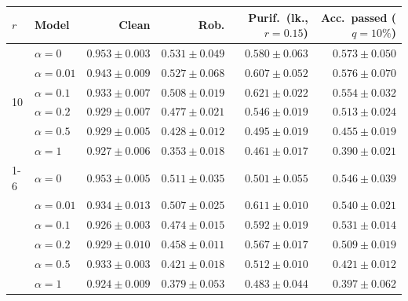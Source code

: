 \begin{tabular}{@{}llrrrr@{}}
\toprule
$r$ & Model & Clean & Rob. & Purif.\ (lk., $r{=}0.15$) & Acc.\ passed ($q{=}10\%$) \\
\midrule
\multirow{6}{*}{10} & $\alpha{=}0$ & $\mathbf{0.953 \pm 0.003}$ & $\mathbf{0.531 \pm 0.049}$ & $0.580 \pm 0.063$ & $0.573 \pm 0.050$ \\
 & $\alpha{=}0.01$ & $0.943 \pm 0.009$ & $0.527 \pm 0.068$ & $0.607 \pm 0.052$ & $\mathbf{0.576 \pm 0.070}$ \\
 & $\alpha{=}0.1$ & $0.933 \pm 0.007$ & $0.508 \pm 0.019$ & $\mathbf{0.621 \pm 0.022}$ & $0.554 \pm 0.032$ \\
 & $\alpha{=}0.2$ & $0.929 \pm 0.007$ & $0.477 \pm 0.021$ & $0.546 \pm 0.019$ & $0.513 \pm 0.024$ \\
 & $\alpha{=}0.5$ & $0.929 \pm 0.005$ & $0.428 \pm 0.012$ & $0.495 \pm 0.019$ & $0.455 \pm 0.019$ \\
 & $\alpha{=}1$ & $0.927 \pm 0.006$ & $0.353 \pm 0.018$ & $0.461 \pm 0.017$ & $0.390 \pm 0.021$ \\
\cmidrule(lr){1-6}
\multirow{6}{*}{20} & $\alpha{=}0$ & $0.953 \pm 0.005$ & $0.511 \pm 0.035$ & $0.501 \pm 0.055$ & $0.546 \pm 0.039$ \\
 & $\alpha{=}0.01$ & $0.934 \pm 0.013$ & $0.507 \pm 0.025$ & $0.611 \pm 0.010$ & $0.540 \pm 0.021$ \\
 & $\alpha{=}0.1$ & $0.926 \pm 0.003$ & $0.474 \pm 0.015$ & $0.592 \pm 0.019$ & $0.531 \pm 0.014$ \\
 & $\alpha{=}0.2$ & $0.929 \pm 0.010$ & $0.458 \pm 0.011$ & $0.567 \pm 0.017$ & $0.509 \pm 0.019$ \\
 & $\alpha{=}0.5$ & $0.933 \pm 0.003$ & $0.421 \pm 0.018$ & $0.512 \pm 0.010$ & $0.421 \pm 0.012$ \\
 & $\alpha{=}1$ & $0.924 \pm 0.009$ & $0.379 \pm 0.053$ & $0.483 \pm 0.044$ & $0.397 \pm 0.062$ \\
\bottomrule
\end{tabular}
